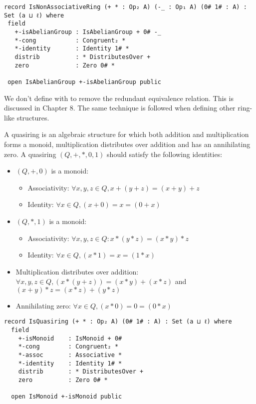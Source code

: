 \begin{verbatim}
record IsNonAssociativeRing (+ * : Op₂ A) (-_ : Op₁ A) (0# 1# : A) : Set (a ⊔ ℓ) where
 field
   +-isAbelianGroup : IsAbelianGroup + 0# -_
   *-cong           : Congruent₂ *
   *-identity       : Identity 1# *
   distrib          : * DistributesOver +
   zero             : Zero 0# *

 open IsAbelianGroup +-isAbelianGroup public
\end{verbatim}

We don't define  with  to
remove the redundant equivalence relation. This is discussed in Chapter 8. The
same technique is followed when defining other ring-like structures.

A quasiring is an algebraic structure for which both addition and multiplication
forms a monoid, multiplication distributes over addition and has an annihilating
zero. A quasiring $(Q,+,*,0,1)$ should satisfy the following identities:
\begin{itemize}
  \item $(Q,+,0)$ is a monoid:
  \begin{itemize}
    \item Associativity: $\forall x,y,z \in Q, x + (y + z) = (x + y) + z$
    \item Identity: $\forall x \in Q, (x + 0) = x = (0 + x)$
  \end{itemize}
  \item $(Q,*,1)$ is a monoid:
  \begin{itemize}
    \item Associativity: $ \forall x,y,z \in Q: x * (y*z)  = (x*y)*z$
    \item Identity: $\forall x \in Q, (x * 1) = x = (1 * x)$
  \end{itemize}
  \item Multiplication distributes over addition: \(\forall x , y , z \in Q, (x * (y + z)) = (x * y) + (x
  * z)\) and \( (x + y) * z = (x * z) + (y * z) \)
  \item Annihilating zero: \(\forall x \in Q, (x * 0) = 0 = (0 * x)\)
\end{itemize}

\begin{verbatim}
record IsQuasiring (+ * : Op₂ A) (0# 1# : A) : Set (a ⊔ ℓ) where
  field
    +-isMonoid    : IsMonoid + 0#
    *-cong        : Congruent₂ *
    *-assoc       : Associative *
    *-identity    : Identity 1# *
    distrib       : * DistributesOver +
    zero          : Zero 0# *

  open IsMonoid +-isMonoid public
\end{verbatim}

